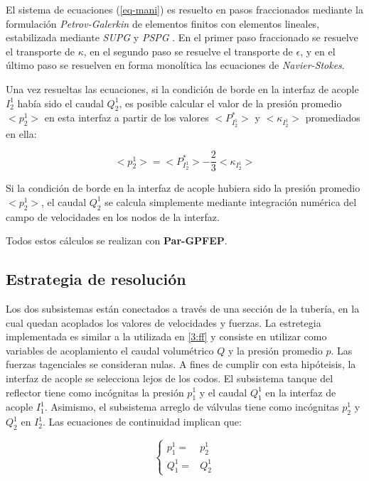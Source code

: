 El sistema de ecuaciones (\ref{eq-mani}) es resuelto en pasos fraccionados \cite{lew} mediante la formulación \textit{Petrov-Galerkin} \cite{galerkin} de elementos finitos con elementos lineales, 
estabilizada mediante \textit{SUPG} \cite{supg} y \textit{PSPG} \cite{pspg}.
En el primer paso fraccionado se resuelve el transporte de $\kappa$,
en el segundo paso se resuelve el transporte de $\epsilon$,
y en el último paso se resuelven en forma monolítica las ecuaciones de \textit{Navier-Stokes}.

Una vez resueltas las ecuaciones,
si la condición de borde en la interfaz de acople $I_2^1$ había sido el caudal $Q_2^1$,
es posible calcular el valor de la presión promedio $<p_2^1>$ en esta interfaz
a partir de los valores $<P^*_{I_2^1}>$ y $<\kappa_{I_2^1}>$ promediados en ella:

\begin{equation}
<p_2^1> = <P^*_{I_2^1}> - \frac {2}{3} <\kappa_{I_2^1}>
\end{equation}

Si la condición de borde en la interfaz de acople hubiera sido la presión promedio $<p_2^1>$,
el caudal $Q_2^1$ se calcula simplemente mediante integración numérica del campo de velocidades en los nodos de la interfaz.

Todos estos cálculos se realizan con \textbf{Par-GPFEP}.

\subsection{Estrategia de resolución}

Los dos subsistemas están conectados a través de una sección de la tubería,
en la cual quedan acoplados los valores de velocidades y fuerzas.
La estretegia implementada es similar a la utilizada en \ref{3:ff} y consiste en utilizar como variables de acoplamiento el caudal volumétrico $Q$ y la presión promedio $p$.
Las fuerzas tagenciales se consideran nulas.
A fines de cumplir con esta hipóteisis, la interfaz de acople se selecciona lejos de los codos.
El subsistema tanque del reflector tiene como incógnitas la presión $p_1^1$ y el caudal $Q_1^1$ en la interfaz de acople $I_1^1$.
Asimismo, el subsistema arreglo de válvulas tiene como incógnitas $p_2^1$ y $Q_2^1$ en $I_2^1$.
Las ecuaciones de continuidad implican que:

\begin{equation}
\left\{ \begin{array}{rl}
p_1^1 =& p_2^1 \\
Q_1^1 =& Q_2^1
\end{array}
\right.
\end{equation}

